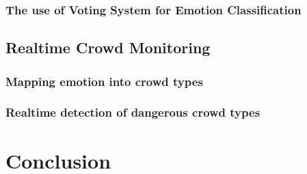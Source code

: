 \subsubsection{The use of Voting System for Emotion Classification}

\subsection{Realtime Crowd Monitoring}

\subsubsection{Mapping emotion into crowd types}

\subsubsection{Realtime detection of dangerous crowd types}

\section{Conclusion}